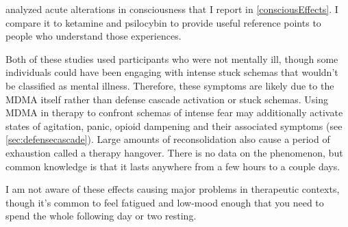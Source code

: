 \documentclass[11pt,oneside]{book}
\begin{document}
\textcite{studerus2010psychometric} analyzed acute alterations in consciousness that I report in \cref{consciousEffects}. I compare it to ketamine and psilocybin to provide useful reference points to people who understand those experiences.

Both of these studies used participants who were not mentally ill, though some individuals could have been engaging with intense stuck schemas that wouldn't be classified as mental illness. Therefore, these symptoms are likely due to the MDMA itself rather than defense cascade activation or stuck schemas. Using MDMA in therapy to confront schemas of intense fear may additionally activate states of agitation, panic, opioid dampening and their associated symptoms (see \cref{sec:defensecascade}). Large amounts of reconsolidation also cause a period of exhaustion called a therapy hangover. There is no data on the phenomenon, but common knowledge is that it lasts anywhere from a few hours to a couple days.

I am not aware of these effects causing major problems in therapeutic contexts, though it's common to feel fatigued and low-mood enough that you need to spend the whole following day or two resting.
\end{document}
